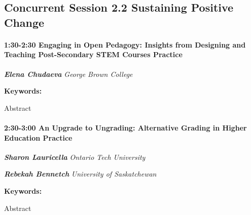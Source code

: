 \documentclass[
]{book}
\begin{document}
\hypertarget{concurrent-session-2.2-sustaining-positive-change}{%
\subsection*{Concurrent Session 2.2 \textbar{} Sustaining Positive Change}\label{concurrent-session-2.2-sustaining-positive-change}}

\begin{session}
\hypertarget{engaging-in-open-pedagogy-insights-from-designing-and-teaching-post-secondary-stem-courses-practice}{%
\paragraph*{\texorpdfstring{1:30-2:30 \textbar{} \textbf{Engaging in
Open Pedagogy: Insights from Designing and Teaching Post-Secondary STEM
Courses} \textbar{}
Practice}{1:30-2:30 \textbar{} Engaging in Open Pedagogy: Insights from Designing and Teaching Post-Secondary STEM Courses \textbar{} Practice}}\label{engaging-in-open-pedagogy-insights-from-designing-and-teaching-post-secondary-stem-courses-practice}}

\textbf{\emph{Elena Chudaeva}} \textbar{} \emph{George Brown College}

\textbf{Keywords:}

Abstract
\end{session}
\begin{session}
\hypertarget{an-upgrade-to-ungrading-alternative-grading-in-higher-education-practice}{%
\paragraph*{\texorpdfstring{2:30-3:00 \textbar{} \textbf{An Upgrade to
Ungrading: Alternative Grading in Higher Education} \textbar{}
Practice}{2:30-3:00 \textbar{} An Upgrade to Ungrading: Alternative Grading in Higher Education \textbar{} Practice}}\label{an-upgrade-to-ungrading-alternative-grading-in-higher-education-practice}}

\textbf{\emph{Sharon Lauricella}} \textbar{} \emph{Ontario Tech
University}

\textbf{\emph{Rebekah Bennetch}} \textbar{} \emph{University of
Saskatchewan}

\textbf{Keywords:}

Abstract
\end{session}
\end{document}
